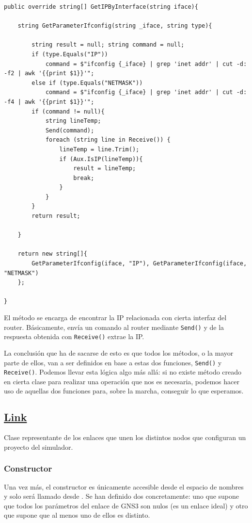 \begin{lstlisting}[language={[Sharp]C}, caption={Método \texttt{GetIPByInterface()} de \texttt{OpenWRT}}, label={herederosnode2}]
public override string[] GetIPByInterface(string iface){

    string GetParameterIfconfig(string _iface, string type){

        string result = null; string command = null;
        if (type.Equals("IP"))
            command = $"ifconfig {_iface} | grep 'inet addr' | cut -d: -f2 | awk '{{print $1}}'";
        else if (type.Equals("NETMASK"))
            command = $"ifconfig {_iface} | grep 'inet addr' | cut -d: -f4 | awk '{{print $1}}'";
        if (command != null){
            string lineTemp;
            Send(command);
            foreach (string line in Receive()) {
                lineTemp = line.Trim();
                if (Aux.IsIP(lineTemp)){
                    result = lineTemp;
                    break;
                }
            }
        }
        return result;

    }

    return new string[]{ 
        GetParameterIfconfig(iface, "IP"), GetParameterIfconfig(iface, "NETMASK") 
    };
    
}
\end{lstlisting}

El método se encarga de encontrar la IP relacionada con cierta interfaz del router. Básicamente, envía un comando al router mediante \texttt{Send()} y de la respuesta obtenida con \texttt{Receive()} extrae la IP.

La conclusión que ha de sacarse de esto es que todos los métodos, o la mayor parte de ellos, van a ser definidos en base a estas dos funciones, \texttt{Send()} y \texttt{Receive()}. Podemos llevar esta lógica algo más allá: si no existe método creado en cierta clase para realizar una operación que nos es necesaria, podemos hacer uso de aquellas dos funciones para, sobre la marcha, conseguir lo que esperamos.

\subsection[Link]{\href{https://github.com/aorestr/GNS3sharp/blob/master/link.cs}{Link}}
Clase representante de los enlaces que unen los distintos nodos que configuran un proyecto del simulador.

\subsubsection{Constructor}
Una vez más, el constructor es únicamente accesible desde el espacio de nombres y solo será llamado desde \GNSCS. Se han definido dos concretamente: uno que supone que todos los parámetros del enlace de GNS3 son nulos (es un enlace ideal) y otro que supone que al menos uno de ellos es distinto.

